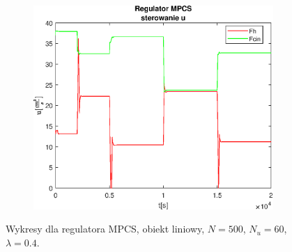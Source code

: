 \begin{figure}[h!]
   \begin{subfigure}[b]{0.4\textwidth}
      \includegraphics[width=1\linewidth]{img/MPCSanaLin/MPCSLinControlN500Nu60l40.eps}
      \caption{}
      \label{fig:fig:MPCSLinN500Nu60l403}
   \end{subfigure}
       
   \caption{Wykresy dla regulatora MPCS, obiekt liniowy, $N = 500$, $N_u = 60$, $\lambda = 0.4$.}
   \label{fig:MPCSLinN500Nu60l40}
\end{figure}
           
